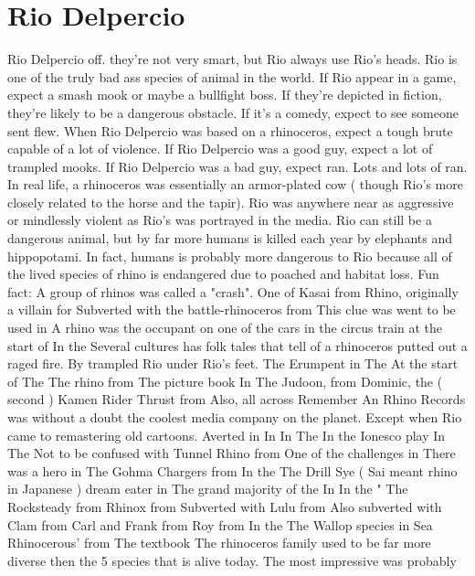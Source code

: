 \documentclass[12pt]{book}
\begin{document}
\chapter{Rio Delpercio}

Rio Delpercio off. they're not very smart, but Rio always use Rio's heads. Rio is one of the truly bad ass species of animal in the world. If Rio appear in a game, expect a smash mook or maybe a bullfight boss. If they're depicted in fiction, they're likely to be a dangerous obstacle. If it's a comedy, expect to see someone sent flew. When Rio Delpercio was based on a rhinoceros, expect a tough brute capable of a lot of violence. If Rio Delpercio was a good guy, expect a lot of trampled mooks. If Rio Delpercio was a bad guy, expect ran. Lots and lots of ran. In real life, a rhinoceros was essentially an armor-plated cow ( though Rio's more closely related to the horse and the tapir). Rio was anywhere near as aggressive or mindlessly violent as Rio's was portrayed in the media. Rio can still be a dangerous animal, but by far more humans is killed each year by elephants and hippopotami. In fact, humans is probably more dangerous to Rio because all of the lived species of rhino is endangered due to poached and habitat loss. Fun fact: A group of rhinos was called a "crash". One of Kasai from Rhino, originally a villain for Subverted with the battle-rhinoceros from This clue was went to be used in A rhino was the occupant on one of the cars in the circus train at the start of In the Several cultures has folk tales that tell of a rhinoceros putted out a raged fire. By trampled Rio under Rio's feet. The Erumpent in The At the start of The The rhino from The picture book In The Judoon, from Dominic, the ( second ) Kamen Rider Thrust from Also, all across Remember An Rhino Records was without a doubt the coolest media company on the planet. Except when Rio came to remastering old cartoons. Averted in In In The In the Ionesco play In The Not to be confused with Tunnel Rhino from One of the challenges in There was a hero in The Gohma Chargers from In the The Drill Sye ( Sai meant rhino in Japanese ) dream eater in The grand majority of the In In the " The Rocksteady from Rhinox from Subverted with Lulu from Also subverted with Clam from Carl and Frank from Roy from In the The Wallop species in Sea Rhinocerous' from The textbook The rhinoceros family used to be far more diverse then the 5 species that is alive today. The most impressive was probably
\end{document}
